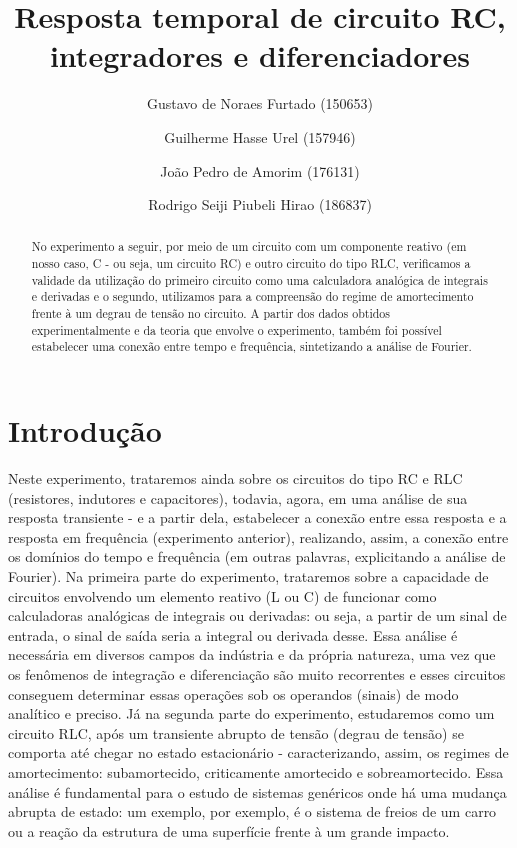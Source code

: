 \documentclass[a4paper]{article}
\title{Resposta temporal de circuito RC,  integradores e diferenciadores}
\author{
    Gustavo de Noraes Furtado (150653)
    \and 
	Guilherme Hasse Urel (157946)
    \and
	João Pedro de Amorim (176131)
	\and 
    Rodrigo Seiji Piubeli Hirao (186837)
    }
\begin{document}
\maketitle

\begin{abstract}
No experimento a seguir, por meio de um circuito com um componente reativo (em nosso caso, C - ou seja, um circuito RC) e outro circuito do tipo RLC, verificamos a validade da utilização do primeiro circuito como uma calculadora analógica de integrais e derivadas e o segundo, utilizamos para a compreensão do regime de amortecimento frente à um degrau de tensão no circuito. A partir dos dados obtidos experimentalmente e da teoria que envolve o experimento, também foi possível estabelecer uma conexão entre tempo e frequência, sintetizando a análise de Fourier.
\end{abstract}

\section{Introdução}
	Neste experimento, trataremos ainda sobre os circuitos do tipo RC e RLC (resistores, indutores e capacitores), todavia, agora, em uma análise de sua resposta transiente - e a partir dela, estabelecer a conexão entre essa resposta e a resposta em frequência (experimento anterior), realizando, assim, a conexão entre os domínios do tempo e frequência (em outras palavras, explicitando a análise de Fourier).
	Na primeira parte do experimento, trataremos sobre a capacidade de circuitos envolvendo um elemento reativo (L ou C) de funcionar como calculadoras analógicas de integrais ou derivadas: ou seja, a partir de um sinal de entrada, o sinal de saída seria a integral ou derivada desse. Essa análise é necessária em diversos campos da indústria e da própria natureza, uma vez que os fenômenos de integração e diferenciação são muito recorrentes e esses circuitos conseguem determinar essas operações sob os operandos (sinais) de modo analítico e preciso. 
    Já na segunda parte do experimento, estudaremos como um circuito RLC, após um transiente abrupto de tensão (degrau de tensão) se comporta até chegar no estado estacionário - caracterizando, assim, os regimes de amortecimento: subamortecido, criticamente amortecido e sobreamortecido. Essa análise é fundamental para o estudo de sistemas genéricos onde há uma mudança abrupta de estado: um exemplo, por exemplo, é o sistema de freios de um carro ou a reação da estrutura de uma superfície frente à um grande impacto.
\end{document}
